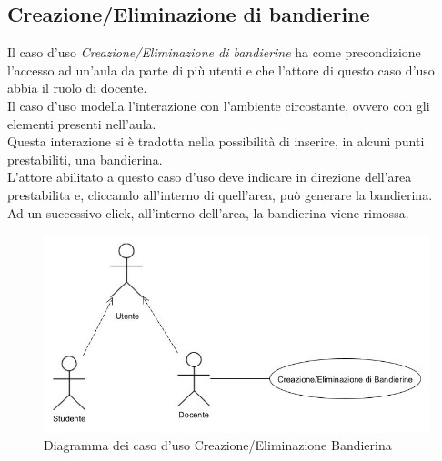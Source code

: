 \subsection{Creazione/Eliminazione di bandierine}
Il caso d'uso \textit{Creazione/Eliminazione di bandierine} ha come precondizione l'accesso ad un'aula da parte di più utenti e che l'attore di questo caso d'uso abbia il ruolo di docente.
\\Il caso d'uso modella l'interazione con l'ambiente circostante, ovvero con gli elementi presenti nell'aula. \\Questa interazione si è tradotta nella possibilità di inserire, in alcuni punti prestabiliti, una bandierina. \\L'attore abilitato a questo caso d'uso deve indicare in direzione dell'area prestabilita e, cliccando all'interno di quell'area, può generare la bandierina. \\Ad un successivo click, all'interno dell'area, la bandierina viene rimossa.
\begin{figure}[H]
    \centering
    \includegraphics[scale=0.6]{Immagini/EnvironmentInteractionUseCase.jpg}
    \caption{Diagramma dei caso d'uso Creazione/Eliminazione Bandierina}
    \label{fig:my_label}
\end{figure}
